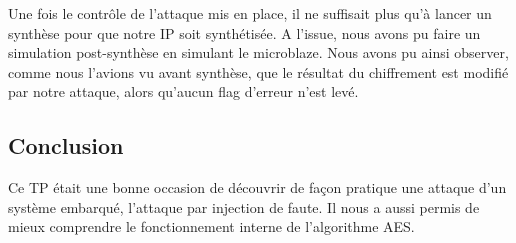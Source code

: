 Une fois le contrôle de l'attaque mis en place, il ne suffisait plus qu'à
lancer un synthèse pour que notre IP soit synthétisée. A l'issue, nous avons pu
faire un simulation post-synthèse en simulant le microblaze. Nous avons pu ainsi
observer, comme nous l'avions vu avant synthèse, que le résultat du chiffrement
est modifié par notre attaque, alors qu'aucun flag d'erreur n'est levé.


\subsection{Conclusion}

Ce TP était une bonne occasion de découvrir de façon pratique une attaque
d'un système embarqué, l'attaque par injection de faute.
Il nous a aussi permis de mieux comprendre le fonctionnement interne de
l'algorithme AES.
